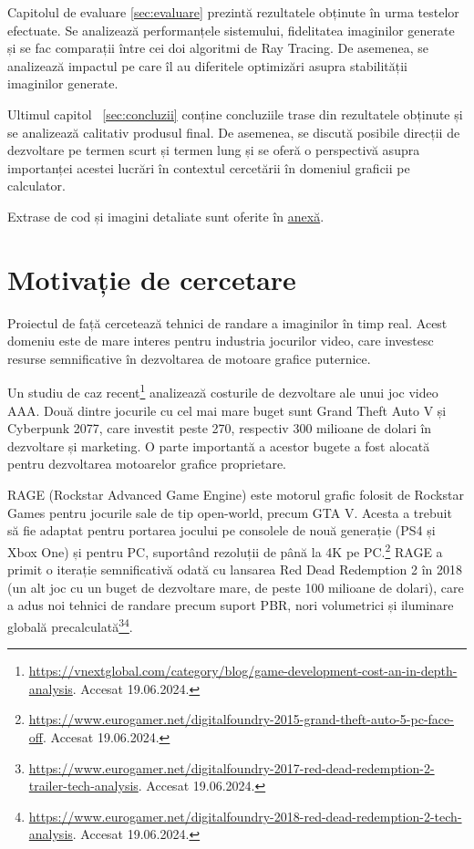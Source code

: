 \documentclass[12pt,a4paper]{report}
\numberwithin{equation}{section} %
\begin{document}
Capitolul de evaluare \ref{sec:evaluare} prezintă rezultatele obținute
în urma testelor efectuate. Se analizează
performanțele sistemului, fidelitatea imaginilor generate și se fac comparații
între cei doi algoritmi de Ray Tracing. De asemenea, se analizează impactul pe
care îl au diferitele optimizări asupra stabilității imaginilor generate.

Ultimul capitol ~\ref{sec:concluzii} conține concluziile trase din
rezultatele obținute și se analizează calitativ produsul final. De asemenea, se
discută posibile direcții de dezvoltare pe termen scurt și termen lung și se oferă o perspectivă asupra
importanței acestei lucrări în contextul cercetării în domeniul graficii pe calculator.

Extrase de cod și imagini detaliate sunt oferite în \hyperref[anexa]{anexă}.

\chapter{\label{sec:motivatie}Motivație de cercetare}

Proiectul de față cercetează tehnici de randare a imaginilor în timp real. Acest
domeniu este de mare interes pentru industria jocurilor video, care investesc
resurse semnificative în dezvoltarea de motoare grafice puternice.

Un studiu de caz
recent\footnote{\label{vnextglobal}\url{https://vnextglobal.com/category/blog/game-development-cost-an-in-depth-analysis}. Accesat 19.06.2024.}
analizează costurile de dezvoltare ale unui joc video AAA. Două dintre jocurile
cu cel mai mare buget sunt Grand Theft Auto V și Cyberpunk 2077, care investit
peste 270, respectiv 300 milioane de dolari în dezvoltare și marketing. O parte
importantă a acestor bugete a fost alocată pentru dezvoltarea motoarelor grafice
proprietare.

RAGE (Rockstar Advanced Game Engine) este motorul grafic folosit
de Rockstar Games pentru jocurile sale de tip open-world, precum GTA V. Acesta a
trebuit să fie adaptat pentru portarea jocului pe consolele de nouă generație
(PS4 și Xbox One) și pentru PC, suportând rezoluții de până la 4K pe PC.\footnote{\url{https://www.eurogamer.net/digitalfoundry-2015-grand-theft-auto-5-pc-face-off}. Accesat 19.06.2024.}
RAGE a primit o iterație semnificativă odată cu lansarea Red Dead Redemption 2 în 2018
(un alt joc cu un buget de dezvoltare mare, de peste 100 milioane de dolari),
care a adus noi tehnici de randare precum suport PBR, nori volumetrici și iluminare globală
precalculată\footnote{\url{https://www.eurogamer.net/digitalfoundry-2017-red-dead-redemption-2-trailer-tech-analysis}. Accesat 19.06.2024.}\footnote{\url{https://www.eurogamer.net/digitalfoundry-2018-red-dead-redemption-2-tech-analysis}. Accesat 19.06.2024.}.
\end{document}
